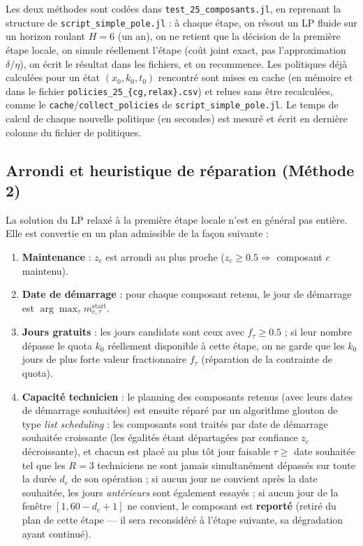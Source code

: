 \documentclass[11pt]{article}
\begin{document}
Les deux méthodes sont codées dans \texttt{test\_25\_composants.jl}, en reprenant la structure de
\texttt{script\_simple\_pole.jl} : à chaque étape, on résout un LP fluide sur un horizon roulant $H=6$
(un an), on ne retient que la décision de la première étape locale, on simule réellement l'étape (coût
joint exact, pas l'approximation $\delta/\eta$), on écrit le résultat dans les fichiers, et on recommence.
Les politiques déjà calculées pour un état $(x_0,k_0,t_0)$ rencontré sont mises en cache (en mémoire et
dans le fichier \texttt{policies\_25\_\{cg,relax\}.csv}) et relues sans être recalculées, comme le
\texttt{cache}/\texttt{collect\_policies} de \texttt{script\_simple\_pole.jl}. Le temps de calcul de
chaque nouvelle politique (en secondes) est mesuré et écrit en dernière colonne du fichier de politiques.

\subsection{Arrondi et heuristique de réparation (Méthode 2)}

La solution du LP relaxé à la première étape locale n'est en général pas entière. Elle est convertie en
un plan admissible de la façon suivante :
\begin{enumerate}
  \item \textbf{Maintenance} : $z_c$ est arrondi au plus proche ($z_c\ge0.5 \Rightarrow$ composant $c$
        maintenu).
  \item \textbf{Date de démarrage} : pour chaque composant retenu, le jour de démarrage est
        $\arg\max_\tau m^{\text{start}}_{c,\tau}$.
  \item \textbf{Jours gratuits} : les jours candidats sont ceux avec $f_\tau\ge0.5$ ; si leur nombre
        dépasse le quota $k_0$ réellement disponible à cette étape, on ne garde que les $k_0$ jours de
        plus forte valeur fractionnaire $f_\tau$ (réparation de la contrainte de quota).
  \item \textbf{Capacité technicien} : le planning des composants retenus (avec leurs dates de démarrage
        souhaitées) est ensuite réparé par un algorithme glouton de type \emph{list scheduling} : les
        composants sont traités par date de démarrage souhaitée croissante (les égalités étant départagées
        par confiance $z_c$ décroissante), et chacun est placé au plus tôt jour faisable
        $\tau\ge$ date souhaitée tel que les $R=3$ techniciens ne sont jamais simultanément dépassés sur
        toute la durée $d_c$ de son opération ; si aucun jour ne convient après la date souhaitée, les
        jours \emph{antérieurs} sont également essayés ; si aucun jour de la fenêtre $[1,60-d_c+1]$ ne
        convient, le composant est \textbf{reporté} (retiré du plan de cette étape --- il sera reconsidéré
        à l'étape suivante, sa dégradation ayant continué).
\end{enumerate}
\end{document}
